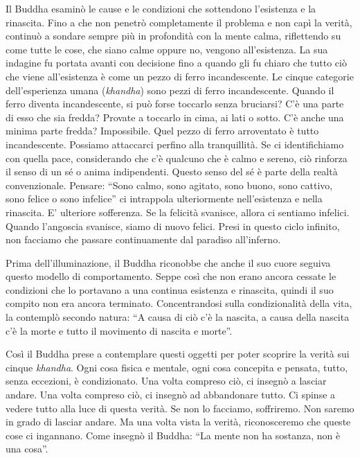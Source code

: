 Il Buddha esaminò le cause e le condizioni che sottendono l'esistenza e
la rinascita. Fino a che non penetrò completamente il problema e non
capì la verità, continuò a sondare sempre più in profondità con la mente
calma, riflettendo su come tutte le cose, che siano calme oppure no,
vengono all'esistenza. La sua indagine fu portata avanti con decisione
fino a quando gli fu chiaro che tutto ciò che viene all'esistenza è come
un pezzo di ferro incandescente. Le cinque categorie dell'esperienza
umana (\emph{khandha}) sono pezzi di ferro incandescente. Quando il ferro
diventa incandescente, si può forse toccarlo senza bruciarsi? C'è una
parte di esso che sia fredda? Provate a toccarlo in cima, ai lati o
sotto. C'è anche una minima parte fredda? Impossibile. Quel pezzo di
ferro arroventato è tutto incandescente. Possiamo attaccarci perfino
alla tranquillità. Se ci identifichiamo con quella pace, considerando
che c'è qualcuno che è calmo e sereno, ciò rinforza il senso di un sé o
anima indipendenti. Questo senso del sé è parte della realtà
convenzionale. Pensare: ``Sono calmo, sono agitato, sono buono, sono
cattivo, sono felice o sono infelice'' ci intrappola ulteriormente
nell'esistenza e nella rinascita. E' ulteriore sofferenza. Se la
felicità svanisce, allora ci sentiamo infelici. Quando l'angoscia
svanisce, siamo di nuovo felici. Presi in questo ciclo infinito, non
facciamo che passare continuamente dal paradiso all'inferno.

Prima dell'illuminazione, il Buddha riconobbe che anche il suo cuore
seguiva questo modello di comportamento. Seppe così che non erano ancora
cessate le condizioni che lo portavano a una continua esistenza e
rinascita, quindi il suo compito non era ancora terminato.
Concentrandosi sulla condizionalità della vita, la contemplò secondo
natura: ``A causa di ciò c'è la nascita, a causa della nascita c'è la
morte e tutto il movimento di nascita e morte''.

Così il Buddha prese a
contemplare questi oggetti per poter scoprire la verità sui cinque
\emph{khandha}. Ogni cosa fisica e mentale, ogni cosa concepita e pensata,
tutto, senza eccezioni, è condizionato. Una volta compreso ciò, ci
insegnò a lasciar andare. Una volta compreso ciò, ci insegnò ad
abbandonare tutto. Ci spinse a vedere tutto alla luce di questa verità.
Se non lo facciamo, soffriremo. Non saremo in grado di lasciar andare.
Ma una volta vista la verità, riconosceremo che queste cose ci
ingannano. Come insegnò il Buddha: ``La mente non ha sostanza, non è una
cosa''.

